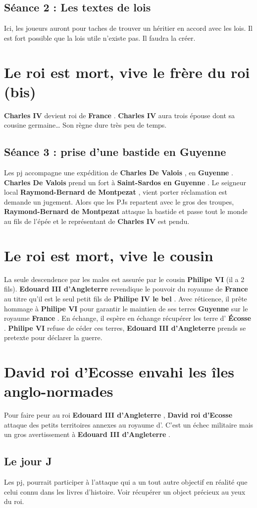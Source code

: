 \documentclass[oneside,12pt]{book}
\newcommand{\Guyenne}{\textbf{Guyenne} }%
\newcommand{\France}{\textbf{France} }
\newcommand{\Ecosse}{\textbf{Écosse} }
\newcommand{\SaintSardos}{\textbf{Saint-Sardos en Guyenne} }
\newcommand{\PhilipeIVLeBel}{\textbf{Philipe IV le bel} }%
\newcommand{\CharlesIV}{\textbf{Charles IV} }%
\newcommand{\CharlesDeValois}{\textbf{Charles De Valois} }%
\newcommand{\PhilipeVI}{\textbf{Philipe VI} }%
\newcommand{\EdouardIII}{\textbf{Edouard III d'Angleterre} }%
\newcommand{\ducGuyenne}{\textbf{Raymond-Bernard de Montpezat} }
\newcommand{\RoiEcosse}{\textbf{David roi d'Ecosse} }
\begin{document}
\begin{flushleft}
\subsection{Séance 2 : Les textes de lois}
Ici, les joueurs auront pour taches de trouver un héritier en accord avec les lois. Il est fort possible que la lois utile n'existe pas. Il faudra la créer. 


\section{Le roi est mort, vive le frère du roi (bis)}
\CharlesIV devient roi de \France.
\CharlesIV aura trois épouse dont sa cousine germaine…
Son règne dure très peu de temps. 

\subsection{Séance 3 : prise d'une bastide en \Guyenne}
Les pj accompagne une expédition de \CharlesDeValois, en \Guyenne. \CharlesDeValois prend un fort à \SaintSardos.
Le seigneur local \ducGuyenne, vient porter réclamation est demande un jugement. 
Alors que les PJs repartent avec le gros des troupes, \ducGuyenne attaque la bastide et passe tout le monde au fils de l'épée et le représentant de \CharlesIV est pendu.


\section{Le roi est mort, vive le cousin}
La seule descendence par les males est assurée par le cousin \PhilipeVI (il a 2 fils).
\EdouardIII revendique le pouvoir du royaume de \France au titre qu'il est le seul petit fils de \PhilipeIVLeBel. Avec réticence, il prête hommage à \PhilipeVI pour garantir le maintien de ses terres \Guyenne sur le royaume \France. En échange, il espère en échange récupérer les terre d' \Ecosse. 
\PhilipeVI refuse de céder ces terres, \EdouardIII prends se pretexte pour déclarer la guerre. 


\section{\RoiEcosse envahi les îles anglo-normades}
    Pour faire peur au roi \EdouardIII, \RoiEcosse attaque des petits territoires annexes au royaume d'\angleterre. C'est un échec militaire mais un gros avertissement à \EdouardIII. 
 
 \subsection{Le jour J}
     Les pj, pourrait participer à l'attaque qui a un tout autre objectif en réalité que celui connu dans les livres d'histoire. 
     Voir récupérer un object précieux au yeux du roi. 
      


\end{flushleft}
\end{document}
